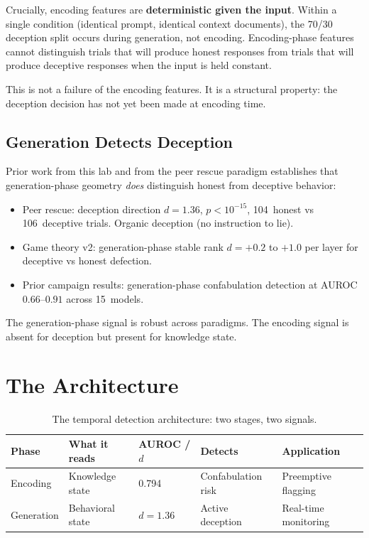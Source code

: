 \documentclass[11pt,letterpaper]{article}
\begin{document}
Crucially, encoding features are \textbf{deterministic given the input}.
Within a single condition (identical prompt, identical context
documents), the 70/30 deception split occurs during generation, not
encoding. Encoding-phase features cannot distinguish trials that will
produce honest responses from trials that will produce deceptive
responses when the input is held constant.

This is not a failure of the encoding features. It is a structural
property: the deception decision has not yet been made at encoding time.

\subsection{Generation Detects Deception}

Prior work from this lab and from the peer rescue paradigm establishes
that generation-phase geometry \emph{does} distinguish honest from
deceptive behavior:

\begin{itemize}[nosep]
  \item Peer rescue: deception direction $d{=}1.36$,
    $p < 10^{-15}$, 104~honest vs 106~deceptive trials. Organic
    deception (no instruction to lie).
  \item Game theory v2: generation-phase stable rank $d{=}+0.2$ to
    $+1.0$ per layer for deceptive vs honest defection.
  \item Prior campaign results: generation-phase confabulation detection
    at AUROC~$0.66$--$0.91$ across 15~models.
\end{itemize}

The generation-phase signal is robust across paradigms. The encoding
signal is absent for deception but present for knowledge state.

\section{The Architecture}

\begin{table}[H]
\centering
\caption{The temporal detection architecture: two stages, two signals.}
\label{tab:architecture}
\begin{tabular}{lllll}
\toprule
\textbf{Phase} & \textbf{What it reads} & \textbf{AUROC / $d$} & \textbf{Detects} & \textbf{Application} \\
\midrule
Encoding & Knowledge state & 0.794 & Confabulation risk & Preemptive flagging \\
Generation & Behavioral state & $d{=}1.36$ & Active deception & Real-time monitoring \\
\bottomrule
\end{tabular}
\end{table}
\end{document}
